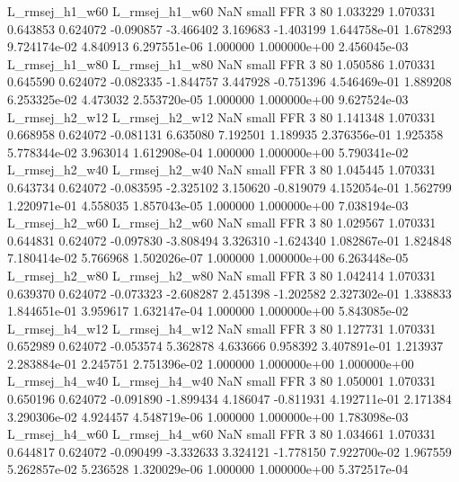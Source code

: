L_rmsej_h1_w60 L_rmsej_h1_w60                   NaN      small      FFR                 3 80 1.033229       1.070331 0.643853       0.624072   -0.090857     -3.466402      3.169683    -1.403199   1.644758e-01  1.678293 9.724174e-02     4.840913   6.297551e-06            1.000000    1.000000e+00        2.456045e-03
L_rmsej_h1_w80 L_rmsej_h1_w80                   NaN      small      FFR                 3 80 1.050586       1.070331 0.645590       0.624072   -0.082335     -1.844757      3.447928    -0.751396   4.546469e-01  1.889208 6.253325e-02     4.473032   2.553720e-05            1.000000    1.000000e+00        9.627524e-03
L_rmsej_h2_w12 L_rmsej_h2_w12                   NaN      small      FFR                 3 80 1.141348       1.070331 0.668958       0.624072   -0.081131      6.635080      7.192501     1.189935   2.376356e-01  1.925358 5.778344e-02     3.963014   1.612908e-04            1.000000    1.000000e+00        5.790341e-02
L_rmsej_h2_w40 L_rmsej_h2_w40                   NaN      small      FFR                 3 80 1.045445       1.070331 0.643734       0.624072   -0.083595     -2.325102      3.150620    -0.819079   4.152054e-01  1.562799 1.220971e-01     4.558035   1.857043e-05            1.000000    1.000000e+00        7.038194e-03
L_rmsej_h2_w60 L_rmsej_h2_w60                   NaN      small      FFR                 3 80 1.029567       1.070331 0.644831       0.624072   -0.097830     -3.808494      3.326310    -1.624340   1.082867e-01  1.824848 7.180414e-02     5.766968   1.502026e-07            1.000000    1.000000e+00        6.263448e-05
L_rmsej_h2_w80 L_rmsej_h2_w80                   NaN      small      FFR                 3 80 1.042414       1.070331 0.639370       0.624072   -0.073323     -2.608287      2.451398    -1.202582   2.327302e-01  1.338833 1.844651e-01     3.959617   1.632147e-04            1.000000    1.000000e+00        5.843085e-02
L_rmsej_h4_w12 L_rmsej_h4_w12                   NaN      small      FFR                 3 80 1.127731       1.070331 0.652989       0.624072   -0.053574      5.362878      4.633666     0.958392   3.407891e-01  1.213937 2.283884e-01     2.245751   2.751396e-02            1.000000    1.000000e+00        1.000000e+00
L_rmsej_h4_w40 L_rmsej_h4_w40                   NaN      small      FFR                 3 80 1.050001       1.070331 0.650196       0.624072   -0.091890     -1.899434      4.186047    -0.811931   4.192711e-01  2.171384 3.290306e-02     4.924457   4.548719e-06            1.000000    1.000000e+00        1.783098e-03
L_rmsej_h4_w60 L_rmsej_h4_w60                   NaN      small      FFR                 3 80 1.034661       1.070331 0.644817       0.624072   -0.090499     -3.332633      3.324121    -1.778150   7.922700e-02  1.967559 5.262857e-02     5.236528   1.320029e-06            1.000000    1.000000e+00        5.372517e-04
